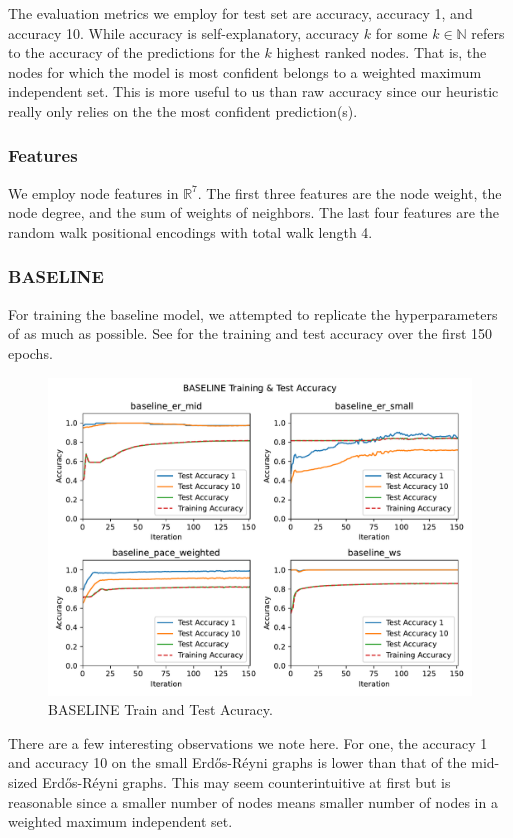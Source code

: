 \documentclass{article}
\newcommand{\R}{\mathbb{R}}
\newcommand{\N}{\mathbb{N}}
\begin{document}
The evaluation metrics we employ for test set are accuracy,
accuracy 1,
and accuracy 10.
While accuracy is self-explanatory,
accuracy $k$ for some $k\in \N$ refers to the accuracy of the predictions for the $k$ highest ranked nodes.
That is,
the nodes for which the model is most confident belongs to a weighted maximum independent set.
This is more useful to us than raw accuracy
since our heuristic really only relies on the the most confident prediction(s).
\subsubsection{Features}
We employ node features in $\R^7$.
The first three features are the node weight,
the node degree,
and the sum of weights of neighbors.
The last four features are the random walk positional encodings
with total walk length 4.

\subsubsection{BASELINE}
For training the baseline model,
we attempted to replicate the hyperparameters of \citet{langedal_et_al}
as much as possible.
See  for the training and test accuracy over the first 150 epochs.

\begin{figure}
     \centering
     \includegraphics[width=\textwidth]{figures/baseline_test}
     \caption{BASELINE Train and Test Acuracy.}
     \label{fig:baseline_test}
\end{figure}

There are a few interesting observations we note here.
For one,
the accuracy 1 and accuracy 10 on the small Erd\H os-R\'eyni graphs
is lower than that of the mid-sized Erd\H os-R\'eyni graphs.
This may seem counterintuitive at first
but is reasonable since a smaller number of nodes means smaller number of nodes in a weighted maximum independent set.
\end{document}
